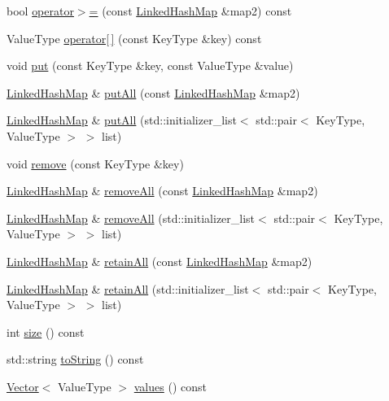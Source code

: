 \begin{DoxyCompactItemize}
\item 
bool \mbox{\hyperlink{classLinkedHashMap_a10dcd6f0ad26dff43ab6f4873243a449}{operator$>$=}} (const \mbox{\hyperlink{classLinkedHashMap}{Linked\+Hash\+Map}} \&map2) const
\item 
Value\+Type \mbox{\hyperlink{classLinkedHashMap_a9f52896b148cfbbc16e12ad1008971b1}{operator\mbox{[}$\,$\mbox{]}}} (const Key\+Type \&key) const
\item 
void \mbox{\hyperlink{classLinkedHashMap_af0d1d70a37332cb3054fe5b1b170927c}{put}} (const Key\+Type \&key, const Value\+Type \&value)
\item 
\mbox{\hyperlink{classLinkedHashMap}{Linked\+Hash\+Map}} \& \mbox{\hyperlink{classLinkedHashMap_a6a0e6f4c23d4e1e470e793b19ab62b52}{put\+All}} (const \mbox{\hyperlink{classLinkedHashMap}{Linked\+Hash\+Map}} \&map2)
\item 
\mbox{\hyperlink{classLinkedHashMap}{Linked\+Hash\+Map}} \& \mbox{\hyperlink{classLinkedHashMap_a8cb591b953a8e479b178b4ed111f39e8}{put\+All}} (std\+::initializer\+\_\+list$<$ std\+::pair$<$ Key\+Type, Value\+Type $>$ $>$ list)
\item 
void \mbox{\hyperlink{classLinkedHashMap_ac6e7e5198a9f1c8b2cc40fbd1d0eb3b0}{remove}} (const Key\+Type \&key)
\item 
\mbox{\hyperlink{classLinkedHashMap}{Linked\+Hash\+Map}} \& \mbox{\hyperlink{classLinkedHashMap_a192b64f541a02885811d43505ac99d6f}{remove\+All}} (const \mbox{\hyperlink{classLinkedHashMap}{Linked\+Hash\+Map}} \&map2)
\item 
\mbox{\hyperlink{classLinkedHashMap}{Linked\+Hash\+Map}} \& \mbox{\hyperlink{classLinkedHashMap_aa3c3540443fba343b0e8ecfea1ce14b1}{remove\+All}} (std\+::initializer\+\_\+list$<$ std\+::pair$<$ Key\+Type, Value\+Type $>$ $>$ list)
\item 
\mbox{\hyperlink{classLinkedHashMap}{Linked\+Hash\+Map}} \& \mbox{\hyperlink{classLinkedHashMap_a9bcc3af0a0717671f5bf22f2c886f7ff}{retain\+All}} (const \mbox{\hyperlink{classLinkedHashMap}{Linked\+Hash\+Map}} \&map2)
\item 
\mbox{\hyperlink{classLinkedHashMap}{Linked\+Hash\+Map}} \& \mbox{\hyperlink{classLinkedHashMap_a536d98ab557dfbb13f9b7c712f45243f}{retain\+All}} (std\+::initializer\+\_\+list$<$ std\+::pair$<$ Key\+Type, Value\+Type $>$ $>$ list)
\item 
int \mbox{\hyperlink{classLinkedHashMap_af9593d4a5ff4274efaf429cb4f9e57cc}{size}} () const
\item 
std\+::string \mbox{\hyperlink{classLinkedHashMap_a1fe5121d6528fdea3f243321b3fa3a49}{to\+String}} () const
\item 
\mbox{\hyperlink{classVector}{Vector}}$<$ Value\+Type $>$ \mbox{\hyperlink{classLinkedHashMap_a50ccbe4184324f0da975648a12728d20}{values}} () const
\end{DoxyCompactItemize}
